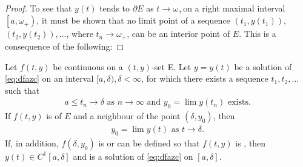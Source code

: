 \documentclass{article}
\begin{document}
\begin{proof}

To see that $y(t)$ tends to $\partial E$ as $t \rightarrow \omega_{+}$on a right maximal interval $\left[a, \omega_{+}\right)$, it must be shown that no limit point of a sequence $\left(t_{1}, y\left(t_{1}\right)\right)$, $\left(t_{2}, y\left(t_{2}\right)\right), \ldots$, where $t_{n} \rightarrow \omega_{+}$, can be an interior point of $E .$ This is a consequence of the following:
\end{proof}
\begin{lema}\label{lem:pkmcv}
Let $f(t, y)$ be continuous on a $(t, y)$-set E. Let $y=y(t)$ be a solution of \cref{eq:dfazc} on an interval $[a, \delta), \delta<\infty$, for which there exists a sequence $t_{1}, t_{2}, \ldots$ such that 
\begin{align}
a \le t_{n} \rightarrow \delta\text{ as }n \rightarrow \infty\text{ and }y_{0}=\lim y\left(t_{n}\right)\text{ exists}.
\end{align}
If $f(t, y)$ is  of $E$ and a neighbour of the point $\left(\delta, y_{0}\right)$, then
\begin{align}
    y_{0}=\lim y(t) \text{ as $t \rightarrow \delta$.}\label{eq:dafzyf}
\end{align}
If, in addition, $f(\delta, y_{0})$ is or can be defined so that $f(t, y)$ is , then $y(t) \in C^{1}[a, \delta]$ and is a solution of  \cref{eq:dfazc}  on $[a, \delta]$.
\end{lema}
\end{document}
